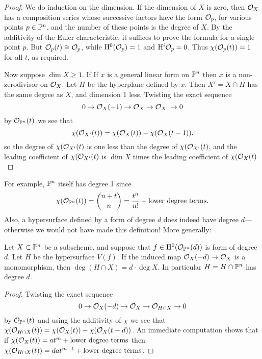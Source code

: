 \begin{proof}
 We do induction on the dimension. If the dimension of $X$ is zero, then $\cO_{X}$ has a composition series
 whose successive factors have the form $\cO_{p}$, for various points $p\in \PP^{n}$, and the number of these points
 is the degree of $X$. By the additivity of the Euler characteristic, it suffices to prove the formula for a single point $p$.
 But $\cO_{p}(t) \cong \cO_{p}$, while $\HH^{0}(\cO_{p}) = 1$ and $\HH^{i}\cO_{p} = 0$. Thus 
 $\chi(\cO_{p}(t)) = 1$ for all $t$, as required.
 
 Now suppose $\dim X\geq 1$. If
 If $x$ is a general linear form on $\PP^{n}$ then $x$ is a non-zerodivisor on 
 $\cO_{X}$. Let $H$ be the hyperplane defined by $x$. Then $X' = X\cap H$ has the same degree as $X$, and dimension
 1 less. Twisting the exact sequence
 $$
 0\to \cO_{X}(-1) \to \cO_{X} \to \cO_{X'} \to 0
 $$
 by $\cO_{\PP^{n}}(t)$ we see that 
 $$
\chi(\cO_{X'}(t)) =  \chi(\cO_{X}(t)) - \chi(\cO_{X}(t-1)).
 $$
so the degree of $\chi(\cO_{X'}(t)$ is one less than the degree of $\chi(\cO_{X'}(t)$, and the leading coefficient
of $\chi(\cO_{X'}(t)$ is $\dim X$  times the leading coefficient of $\chi(\cO_{X}(t)$
\end{proof}

For example, $\PP^{n}$ itself has degree 1 since 
$$
\chi(\cO_{\PP^{n}}(t)) = {n+t\choose n} = \frac{t^{n}}{n!} +\hbox{lower degree terms}.
$$
Also, a hypersurface defined by a form of degree $d$ does indeed have degree $d$---otherwise we would not have made
this definition! More generally:

\begin{lemma}\label{nzd Bezout}
Let $X\subset \PP^{n}$ be a subscheme, and suppose that $f \in \HH^{0}(\cO_{\PP^{n}}(d))$ is form of degree $d$. Let $H$ be the hypersurface $V(f)$.  If
the induced map $\cO_{X}(-d) \to \cO_{X}$ is a monomorphism, then 
$\deg (H \cap X) = d\cdot\deg X$. In particular $H = H\cap \PP^{n}$ has degree $d$.
\end{lemma}
\begin{proof}
Twisting the exact sequence 
 $$
 0\to \cO_{X}(-d) \to \cO_{X} \to \cO_{H\cap X} \to 0
 $$
 by $\cO_{\PP^{n}}(t)$ and using the additivity of $\chi$ we see that
$\chi(\cO_{H\cap X}(t)) = \chi(\cO_{X}(t)) - \chi(\cO_{X}(t-d))$. An immediate computation shows that if 
$\chi(\cO_{X}(t)) = at^{m} +\hbox{lower degree terms}$ then 
$\chi(\cO_{H\cap X}(t)) = dat^{m-1} +\hbox{lower degree terms}$.
\end{proof}

